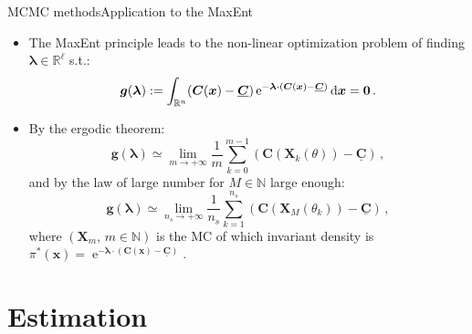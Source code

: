 \documentclass{beamer}
\newcommand{\Nset}{\mathbb{N}}
\newcommand{\Rset}{\mathbb{R}}
\newcommand{\id}{\mathrm{d}}
\newcommand{\iexp}{\operatorname{e}}
\newcommand{\xgj}{x}
\newcommand{\xg}{{\boldsymbol\xgj}}
\newcommand{\mean}[1]{\underline{#1}}
\newcommand{\bzero}{{\bf 0}}
\newcommand{\Xgj}{X}
\newcommand{\Xg}{{\boldsymbol\Xgj}}
\newcommand{\TKij}{\pi}
\newcommand{\SMi}{\TKij^*}
\newcommand{\lagmuli}{\lambda}
\newcommand{\lagmul}{{\boldsymbol\lagmuli}}
\newcommand{\constraint}{{\boldsymbol C}}
\newcommand{\mconstraint}{\mean{\constraint}}
\begin{document}
\begin{frame}{MCMC methods}{Application to the MaxEnt}

\begin{itemize}
\item The MaxEnt principle leads to the non-linear optimization problem of finding $\lagmul\in\Rset^\ell$ s.t.:
\begin{displaymath}
{\boldsymbol g}(\lagmul):=\int_{\Rset^n}(\constraint(\xg)-\mconstraint)\iexp^{-\lagmul\cdot(\constraint(\xg)-\mconstraint)}\id\xg=\bzero\,.
\end{displaymath}
\item By the ergodic theorem:
 \begin{displaymath}
{\boldsymbol g}(\lagmul)\simeq\lim_{m\rightarrow +\infty}\frac{1}{m}\sum_{k=0}^{m-1}\left(\constraint(\Xg_k(\theta))-\mconstraint\right)\,,
\end{displaymath}
and by the law of large number for $M\in\Nset$ large enough:
\begin{displaymath}
{\boldsymbol g}(\lagmul)\simeq\lim_{n_s\rightarrow +\infty}\frac{1}{n_s}\sum_{k=1}^{n_s}\left(\constraint(\Xg_M(\theta_k))-\mconstraint\right)\,,
\end{displaymath}
where $(\Xg_m,\,m\in\Nset)$ is the MC of which invariant density is $\SMi(\xg)=\iexp^{-\lagmul\cdot(\constraint(\xg)-\mconstraint)}$.
\end{itemize}

\end{frame}

\section{Estimation}

\end{document}
